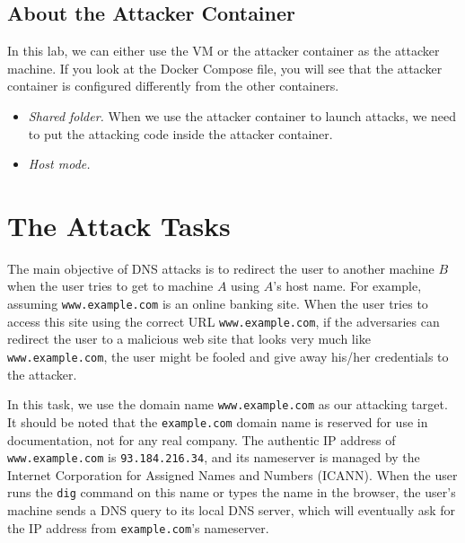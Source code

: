 \subsection{About the Attacker Container}

In this lab, we can either use the VM or the attacker container
as the attacker machine. If you look at the Docker Compose file, you will
see that the attacker container is configured differently from the other
containers.


\begin{itemize}
\item \textit{Shared folder.} When we use the attacker container
to launch attacks, we need to put the attacking code inside
the attacker container.



\item \textit{Host mode.}

\end{itemize}










\section{The Attack Tasks}


The main objective of DNS attacks is to redirect the user
to another machine $B$ when the user tries to get to machine $A$ using
$A$'s host name. For example, assuming {\tt www.example.com} is an online banking 
site.  When the user tries to access this site using the
correct URL {\tt www.example.com}, if the adversaries can redirect the user 
to a malicious web site that looks very much like 
{\tt www.example.com}, the user might be fooled and give away 
his/her credentials to the attacker. 


In this task, we use the domain name {\tt www.example.com}
as our attacking target. It should be noted that the {\tt example.com} 
domain name is reserved for use in documentation, not for 
any real company. The authentic IP address of {\tt www.example.com} is 
{\tt 93.184.216.34}, and its nameserver is managed by
the Internet Corporation for Assigned Names and Numbers (ICANN).
When the user runs the {\tt dig} command 
on this name or types the name in the browser, 
the user's machine sends a DNS query to its local DNS 
server, which will eventually ask for the IP address 
from {\tt example.com}'s nameserver. 



